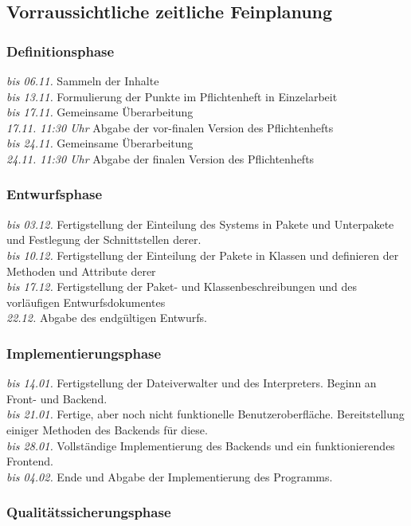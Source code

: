 \documentclass[parskip=full]{scrartcl}
\begin{document}
\subsection{Vorraussichtliche zeitliche Feinplanung}
\subsubsection{Definitionsphase}
\textit{bis 06.11.} Sammeln der Inhalte\\
\textit{bis 13.11.} Formulierung der Punkte im Pflichtenheft in Einzelarbeit\\
\textit{bis 17.11.} Gemeinsame Überarbeitung\\
\textit{17.11. 11:30 Uhr} Abgabe der vor-finalen Version des Pflichtenhefts\\
\textit{bis 24.11.} Gemeinsame Überarbeitung\\
\textit{24.11. 11:30 Uhr} Abgabe der finalen Version des Pflichtenhefts \\

\subsubsection{Entwurfsphase}
\textit{bis 03.12.} Fertigstellung der Einteilung des Systems in Pakete und Unterpakete und Festlegung der Schnittstellen derer. \\
\textit{bis 10.12.} Fertigstellung der Einteilung der Pakete in Klassen und definieren der Methoden und Attribute derer \\
\textit{bis 17.12.} Fertigstellung der Paket- und Klassenbeschreibungen und des vorläufigen Entwurfsdokumentes\\
\textit{22.12.} Abgabe des endgültigen Entwurfs. 

\subsubsection{Implementierungsphase}
\textit{bis 14.01.} Fertigstellung der Dateiverwalter und des Interpreters. Beginn an Front- und Backend.\\
\textit{bis 21.01.} Fertige, aber noch nicht funktionelle Benutzeroberfläche. Bereitstellung einiger Methoden des Backends für diese.\\
\textit{bis 28.01.} Vollständige Implementierung des Backends und ein funktionierendes Frontend.\\
\textit{bis 04.02.} Ende und Abgabe der Implementierung des Programms.

\subsubsection{Qualitätssicherungsphase}
\end{document}
